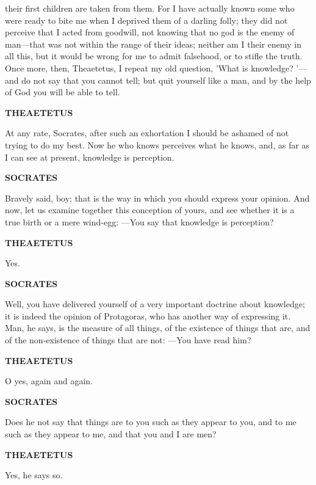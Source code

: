 \documentclass[11pt,letter]{article}
\begin{document}
their first children are taken from them. For I have actually known some who were ready to bite me when I deprived them of a darling folly; they did not perceive that I acted from goodwill, not knowing that no god is the enemy of man—that was not within the range of their ideas; neither am I their enemy in all this, but it would be wrong for me to admit falsehood, or to stifle the truth. Once more, then, Theaetetus, I repeat my old question, 'What is knowledge? '—and do not say that you cannot tell; but quit yourself like a man, and by the help of God you will be able to tell.

\par \textbf{THEAETETUS}
\par   At any rate, Socrates, after such an exhortation I should be ashamed of not trying to do my best. Now he who knows perceives what he knows, and, as far as I can see at present, knowledge is perception.

\par \textbf{SOCRATES}
\par   Bravely said, boy; that is the way in which you should express your opinion. And now, let us examine together this conception of yours, and see whether it is a true birth or a mere wind-egg: —You say that knowledge is perception?

\par \textbf{THEAETETUS}
\par   Yes.

\par \textbf{SOCRATES}
\par   Well, you have delivered yourself of a very important doctrine about knowledge; it is indeed the opinion of Protagoras, who has another way of expressing it. Man, he says, is the measure of all things, of the existence of things that are, and of the non-existence of things that are not: —You have read him?

\par \textbf{THEAETETUS}
\par   O yes, again and again.

\par \textbf{SOCRATES}
\par   Does he not say that things are to you such as they appear to you, and to me such as they appear to me, and that you and I are men?

\par \textbf{THEAETETUS}
\par   Yes, he says so.
\end{document}

